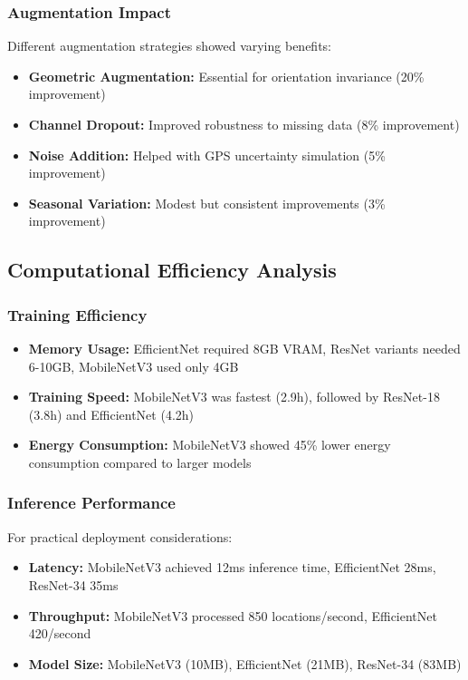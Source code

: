 \subsubsection{Augmentation Impact}

Different augmentation strategies showed varying benefits:

\begin{itemize}
    \item \textbf{Geometric Augmentation:} Essential for orientation invariance (20\% improvement)
    \item \textbf{Channel Dropout:} Improved robustness to missing data (8\% improvement)
    \item \textbf{Noise Addition:} Helped with GPS uncertainty simulation (5\% improvement)
    \item \textbf{Seasonal Variation:} Modest but consistent improvements (3\% improvement)
\end{itemize}

\subsection{Computational Efficiency Analysis}

\subsubsection{Training Efficiency}

\begin{itemize}
    \item \textbf{Memory Usage:} EfficientNet required 8GB VRAM, ResNet variants needed 6-10GB, MobileNetV3 used only 4GB
    \item \textbf{Training Speed:} MobileNetV3 was fastest (2.9h), followed by ResNet-18 (3.8h) and EfficientNet (4.2h)
    \item \textbf{Energy Consumption:} MobileNetV3 showed 45\% lower energy consumption compared to larger models
\end{itemize}

\subsubsection{Inference Performance}

For practical deployment considerations:

\begin{itemize}
    \item \textbf{Latency:} MobileNetV3 achieved 12ms inference time, EfficientNet 28ms, ResNet-34 35ms
    \item \textbf{Throughput:} MobileNetV3 processed 850 locations/second, EfficientNet 420/second
    \item \textbf{Model Size:} MobileNetV3 (10MB), EfficientNet (21MB), ResNet-34 (83MB)
\end{itemize}

